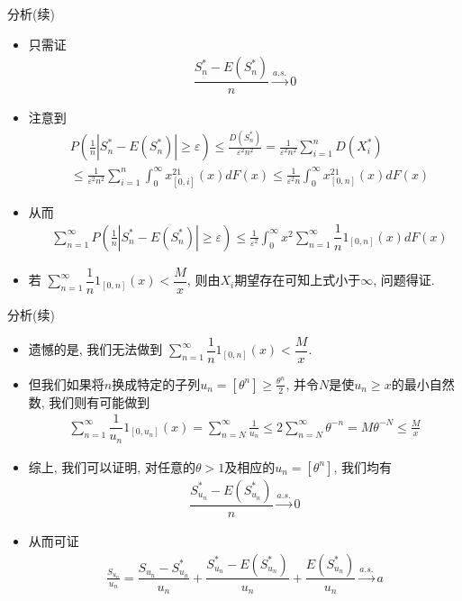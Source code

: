 \begin{frame}{分析(续)}
	\begin{itemize}[<+-|alert@+>]
	\item 只需证
	\begin{align*}
		\dfrac{S_n^*-E(S_n^*)}{n}\stackrel{a.s.}{\rightarrow}  0
	\end{align*}
    \item 注意到
	\begin{align*}
		&P\left(\frac{1}n\left|S_n^{*}-E\left(S_n^{*}\right)\right| \geq \varepsilon\right) \leq \frac{D(S_n^*)}{\varepsilon^{2}n^2}= \frac{1}{\varepsilon^{2}n^2}\sum_{i=1}^nD(X_i^*)\\
		&\leq  \frac{1}{\varepsilon^{2}n^2}\sum_{i=1}^n \int_{0}^{\infty}x^21_{[0,i]}(x) d F(x)\leq \frac{1}{\varepsilon^{2}n} \int_{0}^{\infty}x^21_{[0,n]}(x) d F(x)
	\end{align*}
    \item 从而
	\begin{align*}
		&\sum_{n=1}^\infty P\left(\frac{1}n\left|S_n^{*}-E\left(S_n^{*}\right)\right| \geq \varepsilon\right) \leq \frac{1}{\varepsilon^{2}} \int_{0}^{\infty}x^2\sum_{n=1}^\infty \dfrac{1}{n}1_{[0,n]}(x) d F(x)
	\end{align*}
	\item 若 $\sum_{n=1}^\infty \dfrac{1}{n}1_{[0,n]}(x)<\dfrac{M}{x}$, 则由$X_i$期望存在可知上式小于$\infty$, 问题得证.
	\end{itemize}


\end{frame}

\begin{frame}{分析(续)}
	\begin{itemize}[<+-|alert@+>]
	\item  遗憾的是, 我们无法做到 $\sum_{n=1}^\infty \dfrac{1}{n}1_{[0,n]}(x)<\dfrac{M}{x}$.
	\item 但我们如果将$n$换成特定的子列$u_n=[\theta^n]\geq \frac{\theta^n}{2}$, 并令$N$是使$u_{n} \geq x$的最小自然数, 我们则有可能做到
	\begin{align*}
		\sum_{n=1}^\infty \dfrac{1}{u_n}1_{[0,u_n]}(x)=\sum_{n=N}^{\infty} \frac{1}{u_{n}}\leq 2 \sum_{n=N}^{\infty} \theta^{-n}=M \theta^{-N} \leq \frac{M}{x}
	\end{align*}

	\item 综上, 我们可以证明, 对任意的$\theta>1$及相应的$u_n=[\theta^n]$, 我们均有
	\begin{align*}
		\dfrac{S_{u_n}^*-E(S_{u_n}^*)}{n}\stackrel{a.s.}{\rightarrow}  0
	\end{align*}
	\item 从而可证
	\begin{align*}
		\frac{S_{u_{n}}}{u_{n}}  =\dfrac{S_{u_n}-S_{u_n}^*}{u_n}+\dfrac{S_{u_n}^*-E(S_{u_n}^*)}{u_n}+\dfrac{E(S_{u_n}^*)}{u_n}\stackrel{a.s.}{\rightarrow} a
	\end{align*}

	\end{itemize}


\end{frame}


